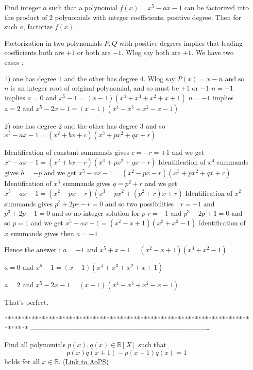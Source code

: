 \begin{solution}
	\begin{tcolorbox}Find integer $a$ such that a polynomial $f(x)=x^5-ax-1$ can be factorized into the product of 2 polynomials with integer coefficients, positive degree. Then for such $a$, factorize $f(x)$.\end{tcolorbox}
Factorization in two polynomials $P,Q$ with positive degrees implies that leading coefficients both are $+1$ or both are $-1$. Wlog say both are $+1$.
We have two cases :

1) one has degree $1$ and the other has degree $4$. Wlog say $P(x)=x-n$ and so $n$ is an integer root of original polynomial, and so must be $+1$ or $-1$
$n=+1$ implies $a=0$ and $x^5-1=(x-1)(x^4+x^3+x^2+x+1)$
$n=-1$ implies $a=2$ and $x^5-2x-1=(x+1)(x^4-x^3+x^2-x-1)$

2) one has degree $2$ and the other has degree $3$ and so
$x^5-ax-1=(x^2+bx+c)(x^3+px^2+qx+r)$

Identification of constant summands gives $c=-r=\pm 1$ and we get $x^5-ax-1=(x^2+bx-r)(x^3+px^2+qx+r)$
Identification of $x^4$ summands gives $b=-p$ and we get $x^5-ax-1=(x^2-px-r)(x^3+px^2+qx+r)$
Identification of $x^3$ summands gives $q=p^2+r$ and we get $x^5-ax-1=(x^2-px-r)(x^3+px^2+(p^2+r)x+r)$
Identification of $x^2$ summands gives $p^3+2pr-r=0$ and so two possibilities :
 $r=+1$ and $p^3+2p-1=0$ and so no integer solution  for $p$
 $r=-1$ and $p^3-2p+1=0$ and so $p=1$ and we get $x^5-ax-1=(x^2-x+1)(x^3+x^2-1)$
Identification of $x$ summands gives then $a=-1$

Hence the answer :
$\boxed{a=-1}$ and $x^5+x-1=(x^2-x+1)(x^3+x^2-1)$

$\boxed{a=0}$ and $x^5-1=(x-1)(x^4+x^3+x^2+x+1)$

$\boxed{a=2}$ and $x^5-2x-1=(x+1)(x^4-x^3+x^2-x-1)$
\end{solution}



\begin{solution}
	That's perfect.
\end{solution}
*******************************************************************************
-------------------------------------------------------------------------------

\begin{problem}
	Find all polynomials $p(x),q(x)\in\mathbb R[X]$ such that
\[
p\left( x \right)q\left( {x + 1} \right) - p\left( {x + 1} \right)q\left( x \right) = 1
\]
holds for all $x \in \mathbb R$.
	\flushright \href{https://artofproblemsolving.com/community/c6h410025}{(Link to AoPS)}
\end{problem}



